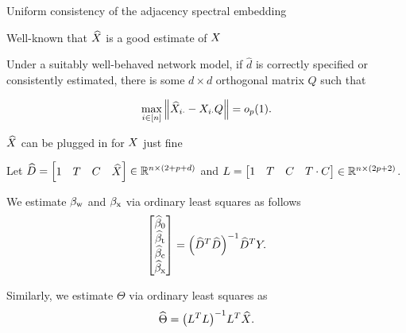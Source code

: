 \documentclass{beamer}
\theoremstyle{remark}
\begin{document}
\begin{frame}{Uniform consistency of the adjacency spectral embedding}

    Well-known that $\widehat{X}$ is a good estimate of $X$

    \begin{lemma}

        Under a suitably well-behaved network model, if $\widehat{d}$ is correctly specified or consistently estimated, there is some $d \times d$ orthogonal matrix $Q$ such that

        \begin{equation*}
            \max_{i \in [n]} \, \norm*{\Xhat_{i \cdot} - \X_{i \cdot} Q} = \op{1}.
        \end{equation*}

    \end{lemma}

\end{frame}


\begin{frame}{$\widehat{X}$ can be plugged in for $X$ just fine}

    Let $\widehat{D} = \begin{bmatrix} 1 & T & C  & \widehat{X} \end{bmatrix} \in \mathbb{R}^{n \times (2 + p + d)}$ and $L = \begin{bmatrix} 1 & T & C  & T \cdot C \end{bmatrix} \in \mathbb{R}^{n \times (2 p + 2)}$.

    We estimate $\beta_\text{w}$ and $\beta_\text{x}$ via ordinary least squares as follows
    \begin{equation*}
        \begin{bmatrix}
            \betazerohat \\
            \betathat    \\
            \betachat    \\
            \betaxhat
        \end{bmatrix}
        = \paren*{\Dhat^T \Dhat}^{-1} \Dhat^T Y.
    \end{equation*}

    Similarly, we estimate $\Theta$ via ordinary least squares as
    \begin{equation*}
        \Thetahat
        = \paren*{\Wfull^T \Wfull}^{-1} \Wfull^T \Xhat.
    \end{equation*}
\end{frame}
\end{document}
